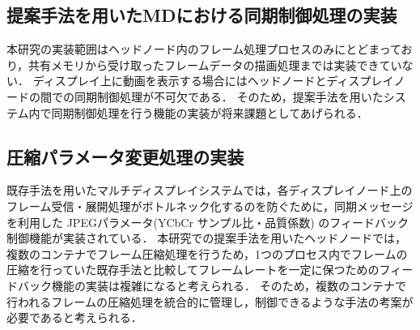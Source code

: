 \clearpage

\subsection*{提案手法を用いたMDにおける同期制御処理の実装}
本研究の実装範囲はヘッドノード内のフレーム処理プロセスのみにとどまっており，共有メモリから受け取ったフレームデータの描画処理までは実装できていない．
ディスプレイ上に動画を表示する場合にはヘッドノードとディスプレイノードの間での同期制御処理が不可欠である．
そのため，提案手法を用いたシステム内で同期制御処理を行う機能の実装が将来課題としてあげられる．

\subsection*{圧縮パラメータ変更処理の実装}
既存手法を用いたマルチディスプレイシステムでは，各ディスプレイノード上のフレーム受信・展開処理がボトルネック化するのを防ぐために，同期メッセージを利用した
JPEGパラメータ(YCbCr サンプル比・品質係数) のフィードバック制御機能が実装されている．
本研究での提案手法を用いたヘッドノードでは，複数のコンテナでフレーム圧縮処理を行うため，1つのプロセス内でフレームの圧縮を行っていた既存手法と比較してフレームレートを一定に保つためのフィードバック機能の実装は複雑になると考えられる．
そのため，複数のコンテナで行われるフレームの圧縮処理を統合的に管理し，制御できるような手法の考案が必要であると考えられる．